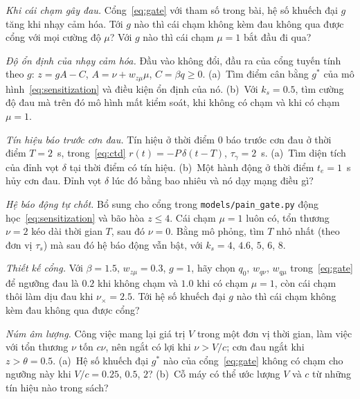 \begin{exercise}[\lvlB]
\label{ex:14:2}
\emph{Khi cái chạm gây đau.} Cổng~\eqref{eq:gate} với tham số trong bài, hệ số khuếch đại $g$ tăng khi nhạy cảm hóa. Tới $g$ nào thì cái chạm không kèm đau không qua được cổng với mọi cường độ $\mu$? Với $g$ nào thì cái chạm $\mu=1$ bắt đầu đi qua?
\end{exercise}

\begin{exercise}[\lvlB]
\label{ex:14:3}
\emph{Độ ổn định của nhạy cảm hóa.} Đầu vào không đổi, đầu ra của cổng tuyến tính theo $g$: $z=gA-C$, $A=\nu+w_{z\mu}\mu$, $C=\beta q\ge0$. (a)~Tìm điểm cân bằng $g^*$ của mô hình~\eqref{eq:sensitization} và điều kiện ổn định của nó. (b)~Với $k_s=0.5$, tìm cường độ đau mà trên đó mô hình mất kiểm soát, khi không có chạm và khi có chạm $\mu=1$.
\end{exercise}

\begin{exercise}[\lvlA]
\label{ex:14:4}
\emph{Tín hiệu báo trước cơn đau.} Tín hiệu ở thời điểm $0$ báo trước cơn đau ở thời điểm $T=2$~s, trong~\eqref{eq:ctd} $r(t)=-P\,\delta(t-T)$, $\tau_\gamma=2$~s. (a)~Tìm diện tích của đỉnh vọt $\delta$ tại thời điểm có tín hiệu. (b)~Một hành động ở thời điểm $t_e=1$~s hủy cơn đau. Đỉnh vọt $\delta$ lúc đó bằng bao nhiêu và nó dạy mạng điều gì?
\end{exercise}

\begin{exercise}[\lvlB]
\label{ex:14:5}
\emph{Hệ báo động tự chốt.} Bổ sung cho cổng trong \texttt{models/\allowbreak pain\_gate.py} động học~\eqref{eq:sensitization} và bão hòa $z\le4$. Cái chạm $\mu=1$ luôn có, tổn thương $\nu=2$ kéo dài thời gian $T$, sau đó $\nu=0$. Bằng mô phỏng, tìm $T$ nhỏ nhất (theo đơn vị $\tau_s$) mà sau đó hệ báo động vẫn bật, với $k_s=4$, $4.6$, $5$, $6$, $8$.
\end{exercise}

\begin{exercise}[\lvlB]
\label{ex:14:6}
\emph{Thiết kế cổng.} Với $\beta=1.5$, $w_{z\mu}=0.3$, $g=1$, hãy chọn $q_0$, $w_{q\nu}$, $w_{q\mu}$ trong~\eqref{eq:gate} để ngưỡng đau là $0.2$ khi không chạm và $1.0$ khi có chạm $\mu=1$, còn cái chạm thôi làm dịu đau khi $\nu_\times=2.5$. Tới hệ số khuếch đại $g$ nào thì cái chạm không kèm đau không qua được cổng?
\end{exercise}

\begin{exercise}[\lvlC]
\label{ex:14:7}
\emph{Núm âm lượng.} Công việc mang lại giá trị $V$ trong một đơn vị thời gian, làm việc với tổn thương $\nu$ tốn $c\nu$, nên ngắt có lợi khi $\nu>V/c$; cơn đau ngắt khi $z>\theta=0.5$. (a)~Hệ số khuếch đại $g^*$ nào của cổng~\eqref{eq:gate} không có chạm cho ngưỡng này khi $V/c=0.25$, $0.5$, $2$? (b)~Cỗ máy có thể ước lượng $V$ và $c$ từ những tín hiệu nào trong sách?
\end{exercise}

